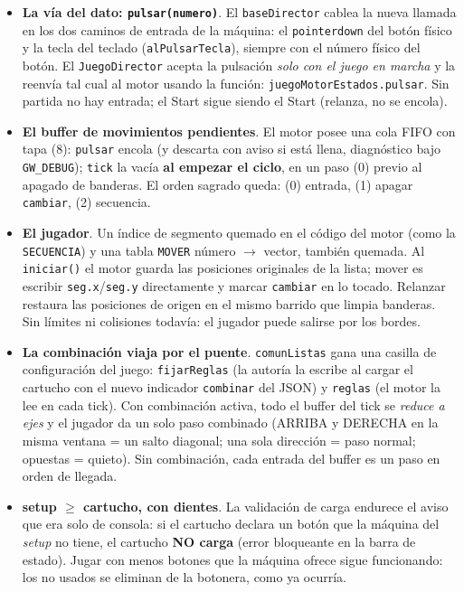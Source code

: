 \begin{itemize}
	\item \textbf{La vía del dato: \texttt{pulsar(numero)}}. El \texttt{baseDirector}
	cablea la nueva llamada en los dos caminos de entrada de la máquina: el
	\texttt{pointerdown} del botón físico y la tecla del teclado
	(\texttt{alPulsarTecla}), siempre con el número físico del botón. El
	\texttt{JuegoDirector} acepta la pulsación \emph{solo con el juego en marcha} y la
	reenvía tal cual al motor usando la función: \texttt{juegoMotorEstados.pulsar}. Sin partida no hay
	entrada; el Start sigue siendo el Start (relanza, no se encola).

	\item \textbf{El buffer de movimientos pendientes}. El motor posee una cola FIFO con
	tapa (8): \texttt{pulsar} encola (y descarta con aviso si está llena, diagnóstico bajo
	\texttt{GW\_DEBUG}); \texttt{tick} la vacía \textbf{al empezar el ciclo}, en un paso
	(0) previo al apagado de banderas. El orden sagrado queda: (0) entrada, (1) apagar
	\texttt{cambiar}, (2) secuencia.

	\item \textbf{El jugador}. Un índice de segmento quemado en el código del motor (como
	la \texttt{SECUENCIA}) y una tabla \texttt{MOVER} número $\rightarrow$ vector, también
	quemada. Al \texttt{iniciar()} el motor guarda las posiciones originales de la lista;
	mover es escribir \texttt{seg.x}/\texttt{seg.y} directamente y marcar
	\texttt{cambiar} en lo tocado. Relanzar restaura las posiciones de origen en el mismo
	barrido que limpia banderas. Sin límites ni colisiones todavía: el jugador puede
	salirse por los bordes.

	\item \textbf{La combinación viaja por el puente}. \texttt{comunListas} gana una
	casilla de configuración del juego: \texttt{fijarReglas} (la autoría la escribe al
	cargar el cartucho con el nuevo indicador \texttt{combinar} del JSON) y
	\texttt{reglas} (el motor la lee en cada tick). Con combinación activa, todo el buffer
	del tick se \emph{reduce a ejes} y el jugador da un solo paso combinado (ARRIBA y
	DERECHA en la misma ventana = un salto diagonal; una sola dirección = paso normal;
	opuestas = quieto). Sin combinación, cada entrada del buffer es un paso en orden de
	llegada.

	\item \textbf{setup $\geq$ cartucho, con dientes}. La validación de carga endurece el
	aviso que era solo de consola: si el cartucho declara un botón que la máquina del
	\textit{setup} no tiene, el cartucho \textbf{NO carga} (error bloqueante en la barra
	de estado). Jugar con menos botones que la máquina ofrece sigue funcionando: los no
	usados se eliminan de la botonera, como ya ocurría.
\end{itemize}

